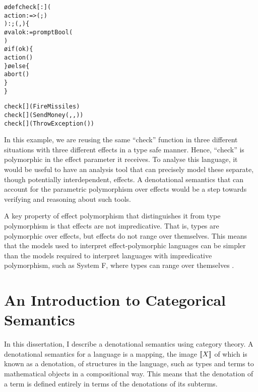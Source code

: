 \documentclass{Report}
\begin{document}
\begin{framed}
    \begin{framed}
        \begin{alltt}
\o{def} check[{}: ](
    action:  => (; )
): ; (, ) \{
    \o{val} ok:  = promptBool(
    )
    \o{if} (ok) \{
        action()
    \} \o{else} \{
       abort()
    \}
\}  
            \end{alltt}
    \end{framed}

    \begin{framed}
        \begin{alltt}
check[](FireMissiles)
check[](SendMoney(, , ))
check[](ThrowException())
        \end{alltt}
    \end{framed}
\end{framed}

In this example, we are reusing the same “check” function in three different situations with three different effects in a type safe manner. Hence, “check” is polymorphic in the effect parameter it receives. To analyse this language, it would be useful to have an analysis tool that can precisely model these separate, though potentially interdependent, effects. A denotational semantics that can account for the parametric polymorphism over effects would be a step towards verifying and reasoning about such tools. 

A key property of effect polymorphism that distinguishes it from type polymorphism is that effects are not impredicative. That is, types are polymorphic over effects, but effects do not range over themselves. This means that the models used to interpret effect-polymorphic languages can be simpler than the models required to interpret languages with impredicative polymorphism, such as System F, where types can range over themselves \cite{PolymorphismIsNotSetTheoretic}. 


\section{An Introduction to Categorical Semantics}

In this dissertation, I describe a denotational semantics using category theory. A denotational semantics for a language is a mapping, the image ${\bf [\![}X{\bf ]\!]}$ of which is known as a denotation, of structures in the language, such as types and terms to mathematical objects in a compositional way. This means that the denotation of a term is defined entirely in terms of the denotations of its subterms.
\end{document}
